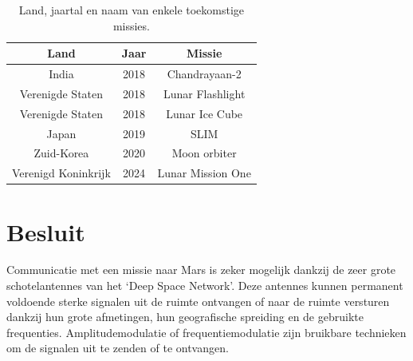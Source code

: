 \begin{table}[ht]
\centering
\small
\begin{tabular}{cc|c} %
Land &Jaar &Missie \\ \hline
India &2018 &Chandrayaan-2 \\ 
Verenigde Staten &2018 &Lunar Flashlight \\ 
Verenigde Staten &2018 &Lunar Ice Cube \\ 
Japan &2019 &SLIM \\
Zuid-Korea &2020 &Moon orbiter \\ 
Verenigd Koninkrijk &2024 &Lunar Mission One \\
\end{tabular}
\caption{Land, jaartal en naam van enkele toekomstige missies.}
\cite{missies}
\label{tab:missies}
\end{table}

\section{Besluit}

Communicatie met een missie naar Mars is zeker mogelijk dankzij de zeer grote schotelantennes van het ‘Deep Space Network’. Deze antennes kunnen permanent voldoende sterke signalen uit de ruimte ontvangen of naar de ruimte versturen dankzij hun grote afmetingen, hun geografische spreiding en de gebruikte frequenties. Amplitudemodulatie of frequentiemodulatie zijn bruikbare technieken om de signalen uit te zenden of te ontvangen.